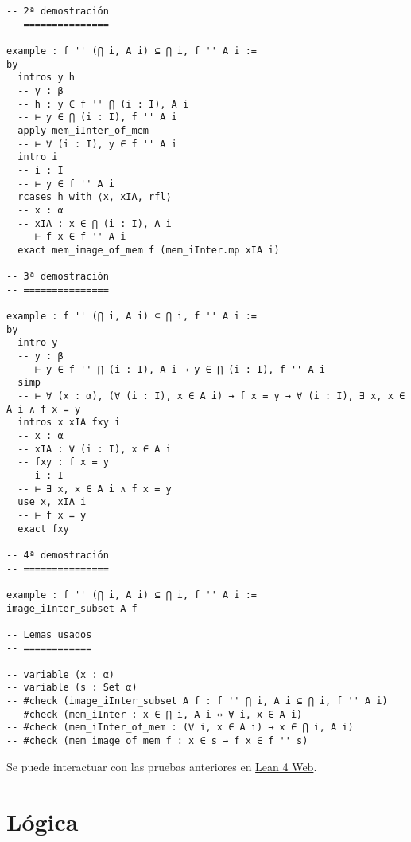 \begin{verbatim}
-- 2ª demostración
-- ===============

example : f '' (⋂ i, A i) ⊆ ⋂ i, f '' A i :=
by
  intros y h
  -- y : β
  -- h : y ∈ f '' ⋂ (i : I), A i
  -- ⊢ y ∈ ⋂ (i : I), f '' A i
  apply mem_iInter_of_mem
  -- ⊢ ∀ (i : I), y ∈ f '' A i
  intro i
  -- i : I
  -- ⊢ y ∈ f '' A i
  rcases h with ⟨x, xIA, rfl⟩
  -- x : α
  -- xIA : x ∈ ⋂ (i : I), A i
  -- ⊢ f x ∈ f '' A i
  exact mem_image_of_mem f (mem_iInter.mp xIA i)

-- 3ª demostración
-- ===============

example : f '' (⋂ i, A i) ⊆ ⋂ i, f '' A i :=
by
  intro y
  -- y : β
  -- ⊢ y ∈ f '' ⋂ (i : I), A i → y ∈ ⋂ (i : I), f '' A i
  simp
  -- ⊢ ∀ (x : α), (∀ (i : I), x ∈ A i) → f x = y → ∀ (i : I), ∃ x, x ∈ A i ∧ f x = y
  intros x xIA fxy i
  -- x : α
  -- xIA : ∀ (i : I), x ∈ A i
  -- fxy : f x = y
  -- i : I
  -- ⊢ ∃ x, x ∈ A i ∧ f x = y
  use x, xIA i
  -- ⊢ f x = y
  exact fxy

-- 4ª demostración
-- ===============

example : f '' (⋂ i, A i) ⊆ ⋂ i, f '' A i :=
image_iInter_subset A f

-- Lemas usados
-- ============

-- variable (x : α)
-- variable (s : Set α)
-- #check (image_iInter_subset A f : f '' ⋂ i, A i ⊆ ⋂ i, f '' A i)
-- #check (mem_iInter : x ∈ ⋂ i, A i ↔ ∀ i, x ∈ A i)
-- #check (mem_iInter_of_mem : (∀ i, x ∈ A i) → x ∈ ⋂ i, A i)
-- #check (mem_image_of_mem f : x ∈ s → f x ∈ f '' s)
\end{verbatim}
Se puede interactuar con las pruebas anteriores en \href{https://lean.math.hhu.de/\#url=https://raw.githubusercontent.com/jaalonso/Calculemus2/main/src/Imagen\_de\_la\_interseccion\_general.lean}{Lean 4 Web}.

\chapter{Lógica}
\label{sec:org60dd932}

